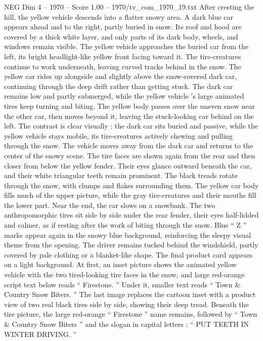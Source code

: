 \begin{textsample}{NEG Dim 4 – 1970 – Score 1.00 – 1970/tv\_com\_1970\_19.txt}
After cresting the hill, the yellow vehicle descends into a flatter snowy area.
A dark blue car appears ahead and to the right, partly buried in snow.
Its roof and hood are covered by a thick white layer, and only parts of its dark body, wheels, and windows remain visible.
The yellow vehicle approaches the buried car from the left, its bright headlight-like yellow front facing toward it.
The tire-creatures continue to work underneath, leaving curved tracks behind in the snow.
The yellow car rides up alongside and slightly above the snow-covered dark car, continuing through the deep drift rather than getting stuck.
The dark car remains low and partly submerged, while the yellow vehicle ’s large animated tires keep turning and biting.
The yellow body passes over the uneven snow near the other car, then moves beyond it, leaving the stuck-looking car behind on the left.
The contrast is clear visually : the dark car sits buried and passive, while the yellow vehicle stays mobile, its tire-creatures actively chewing and pulling through the snow.
The vehicle moves away from the dark car and returns to the center of the snowy scene.
The tire faces are shown again from the rear and then closer from below the yellow fender.
Their eyes glance outward beneath the car, and their white triangular teeth remain prominent.
The black treads rotate through the snow, with clumps and flakes surrounding them.
The yellow car body fills much of the upper picture, while the gray tire-creatures and their mouths fill the lower part.
Near the end, the car slows on a snowbank.
The two anthropomorphic tires sit side by side under the rear fender, their eyes half-lidded and calmer, as if resting after the work of biting through the snow.
Blue “ Z ” marks appear again in the snowy blue background, reinforcing the sleepy visual theme from the opening.
The driver remains tucked behind the windshield, partly covered by pale clothing or a blanket-like shape.
The final product card appears on a light background.
At first, an inset picture shows the animated yellow vehicle with the two tired-looking tire faces in the snow, and large red-orange script text below reads “ Firestone. ” Under it, smaller text reads “ Town \& Country Snow Biters. ” The last image replaces the cartoon inset with a product view of two real black tires side by side, showing their deep tread.
Beneath the tire picture, the large red-orange “ Firestone ” name remains, followed by “ Town \& Country Snow Biters ” and the slogan in capital letters : “ PUT TEETH IN WINTER DRIVING. ”

\end{textsample}
